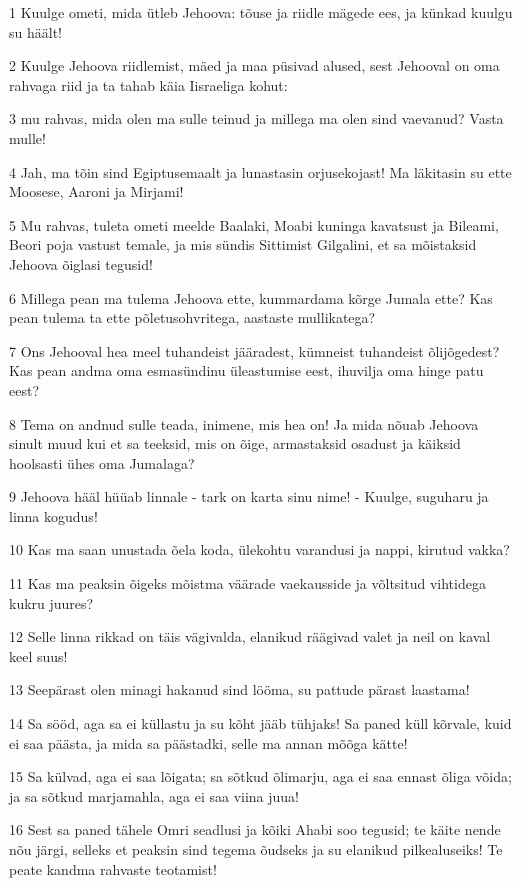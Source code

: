 \par 1 Kuulge ometi, mida ütleb Jehoova: tõuse ja riidle mägede ees, ja künkad kuulgu su häält!
\par 2 Kuulge Jehoova riidlemist, mäed ja maa püsivad alused, sest Jehooval on oma rahvaga riid ja ta tahab käia Iisraeliga kohut:
\par 3 mu rahvas, mida olen ma sulle teinud ja millega ma olen sind vaevanud? Vasta mulle!
\par 4 Jah, ma tõin sind Egiptusemaalt ja lunastasin orjusekojast! Ma läkitasin su ette Moosese, Aaroni ja Mirjami!
\par 5 Mu rahvas, tuleta ometi meelde Baalaki, Moabi kuninga kavatsust ja Bileami, Beori poja vastust temale, ja mis sündis Sittimist Gilgalini, et sa mõistaksid Jehoova õiglasi tegusid!
\par 6 Millega pean ma tulema Jehoova ette, kummardama kõrge Jumala ette? Kas pean tulema ta ette põletusohvritega, aastaste mullikatega?
\par 7 Ons Jehooval hea meel tuhandeist jääradest, kümneist tuhandeist õlijõgedest? Kas pean andma oma esmasündinu üleastumise eest, ihuvilja oma hinge patu eest?
\par 8 Tema on andnud sulle teada, inimene, mis hea on! Ja mida nõuab Jehoova sinult muud kui et sa teeksid, mis on õige, armastaksid osadust ja käiksid hoolsasti ühes oma Jumalaga?
\par 9 Jehoova hääl hüüab linnale - tark on karta sinu nime! - Kuulge, suguharu ja linna kogudus!
\par 10 Kas ma saan unustada õela koda, ülekohtu varandusi ja nappi, kirutud vakka?
\par 11 Kas ma peaksin õigeks mõistma väärade vaekausside ja võltsitud vihtidega kukru juures?
\par 12 Selle linna rikkad on täis vägivalda, elanikud räägivad valet ja neil on kaval keel suus!
\par 13 Seepärast olen minagi hakanud sind lööma, su pattude pärast laastama!
\par 14 Sa sööd, aga sa ei küllastu ja su kõht jääb tühjaks! Sa paned küll kõrvale, kuid ei saa päästa, ja mida sa päästadki, selle ma annan mõõga kätte!
\par 15 Sa külvad, aga ei saa lõigata; sa sõtkud õlimarju, aga ei saa ennast õliga võida; ja sa sõtkud marjamahla, aga ei saa viina juua!
\par 16 Sest sa paned tähele Omri seadlusi ja kõiki Ahabi soo tegusid; te käite nende nõu järgi, selleks et peaksin sind tegema õudseks ja su elanikud pilkealuseiks! Te peate kandma rahvaste teotamist!

